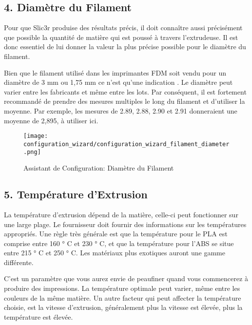 \newpage
\subsection{4. Diam\`etre du Filament}
\label{sub:4_filament_diameter}
Pour que Slic3r produise des r\'esultats pr\'ecis, il doit conna\^itre aussi pr\'ecis\'ement que possible la quantit\'e de mati\`ere qui est pouss\'e \`a travers l'extrudeuse. Il est donc essentiel de lui donner la valeur la plus pr\'ecise possible pour le diam\`etre du filament.

Bien que le filament utilis\'e dans les imprimantes FDM soit vendu pour un diam\`etre de 3 mm ou 1,75 mm ce n'est qu'une indication . Le diam\`etre peut varier entre les fabricants et m\^eme entre les lots. Par cons\'equent, il est fortement recommand\'e de prendre des mesures multiples le long du filament et d'utiliser la moyenne. Par exemple, les mesures de 2.89, 2.88, 2.90 et 2.91 donneraient une moyenne de 2,895, \`a utiliser ici.

\begin{figure}[H]
\centering
\texttt{[image: configuration\_wizard/configuration\_wizard\_filament\_diameter.png]}
\caption{Assistant de Configuration: Diam\`etre du Filament}
\label{fig:configuration_wizard_filament_diameter}
\end{figure}

\newpage
\subsection{5. Temp\'erature d'Extrusion}
\label{sub:5_extrusion_temperature}
La temp\'erature d'extrusion d\'epend de la mati\`ere, celle-ci peut fonctionner sur une large plage. Le fournisseur doit fournir des informations sur les temp\'eratures appropri\'es. Une r\`egle tr\`es g\'en\'erale est que la temp\'erature pour le PLA est comprise entre 160 ° C et 230 ° C, et que la temp\'erature pour l'ABS se situe entre 215 ° C et 250 ° C. Les mat\'eriaux plus exotiques auront une gamme diff\'erente.

C'est un param\`etre que vous aurez envie de peaufiner quand vous commencerez \`a produire des impressions. La temp\'erature optimale peut varier, m\^eme entre les couleurs de la m\^eme mati\`ere. Un autre facteur qui peut affecter la temp\'erature choisie, est la vitesse d'extrusion, g\'en\'eralement plus la vitesse est \'elev\'ee, plus la temp\'erature est \'elev\'ee.

